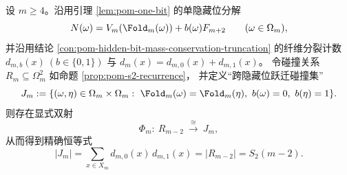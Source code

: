 \begin{theorem}\label{thm:pom-hiddenbit-jump-collision-isomorphism}
设 \(m\ge 4\)。沿用引理 \ref{lem:pom-one-bit} 的单隐藏位分解
\[
N(\omega)=V_m(\Fold_m(\omega))+b(\omega)F_{m+2}\qquad(\omega\in\Omega_m),
\]
并沿用结论 \ref{con:pom-hidden-bit-mass-conservation-truncation} 的纤维分裂计数
\(
d_{m,b}(x)\ (b\in\{0,1\})
\) 与 \(d_m(x)=d_{m,0}(x)+d_{m,1}(x)\)。
令碰撞关系 \(R_m\subseteq\Omega_m^2\) 如命题 \ref{prop:pom-s2-recurrence}，
并定义“跨隐藏位跃迁碰撞集”
\[
J_m:=\{(\omega,\eta)\in\Omega_m\times\Omega_m:\ \Fold_m(\omega)=\Fold_m(\eta),\ b(\omega)=0,\ b(\eta)=1\}.
\]
则存在显式双射
\[
\Phi_m:\ R_{m-2}\ \xrightarrow{\ \cong\ }\ J_m,
\]
从而得到精确恒等式
\[
\boxed{\;
|J_m|
=\sum_{x\in X_m} d_{m,0}(x)\,d_{m,1}(x)
=|R_{m-2}|
=S_2(m-2).\;}
\]
\end{theorem}
